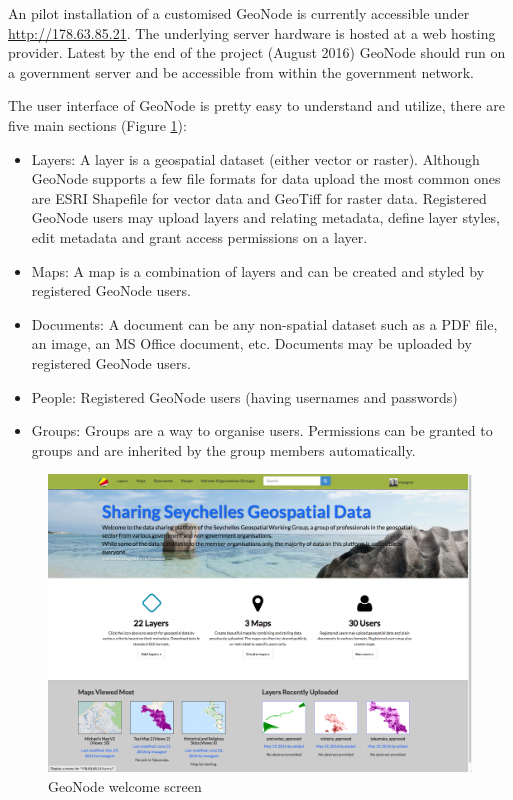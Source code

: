 \documentclass[a4paper,12pt,titlepage]{article}
\begin{document}
An pilot installation of a customised GeoNode is currently accessible under \url{http://178.63.85.21}. The underlying server hardware is hosted at a web hosting provider. Latest by the end of the project (August 2016) GeoNode should run on a government server and be accessible from within the government network.
 
The user interface of GeoNode is pretty easy to understand and utilize, there are five main sections (Figure \ref{fig:geonode_1}):
 
 \begin{itemize}
 	\item Layers: A layer is a geospatial dataset (either vector or raster). Although GeoNode supports a few file formats for data upload the most common ones are ESRI Shapefile for vector data and GeoTiff for raster data. Registered GeoNode users may upload layers and relating metadata, define layer styles, edit metadata and grant access permissions on a layer.
 	\item Maps: A map is a combination of layers and can be created and styled by registered GeoNode users.
 	\item Documents: A document can be any non-spatial dataset such as a PDF file, an image, an MS Office document, etc. Documents may be uploaded by registered GeoNode users.
 	\item People: Registered GeoNode users (having usernames and passwords)
 	\item Groups: Groups are a way to organise users. Permissions can be granted to groups and are inherited by the group members automatically.
 \end{itemize}
 
 \begin{figure}[H]
 	\centering
 	\includegraphics[width=12cm]{Images/geonode_1.png}
 	\caption{GeoNode welcome screen}\label{fig:geonode_1}
 \end{figure}
 
\end{document}
